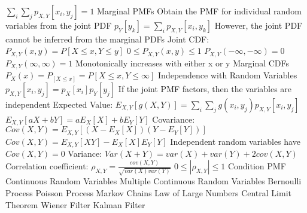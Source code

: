 \documentclass[14pt]{extarticle}
\begin{document}
\begin{outline}
			\2	$\sum_i \sum_j p_{X,Y}[x_i,y_j] = 1$
			\2	Marginal PMFs
				\3	Obtain the PMF for individual random variables from the joint PDF
				\3	$p_Y[y_k] = \sum_i p_{X,Y}[x_i,y_k]$
				\3	However, the joint PDF cannot be inferred from the marginal PDFs
			\2	Joint CDF:	$P_{X,Y}(x,y) = P[X \le x, Y \le y]$
				\3	$0 \le P_{X,Y}(x,y) \le 1$
				\3	$P_{X,Y}(-\infty,-\infty) = 0$
				\3	$P_{X,Y}(\infty,\infty) = 1$
				\3	Monotonically increases with either x or y
			\2	Marginal CDFs
				\3	$P_X(x) = P_[X \le x] = P[X \le x, Y \le \infty]$
			\2	Independence with Random Variables
				\3	$p_{X,Y}[x_i,y_j] = p_X[x_i]p_Y[y_j]$
				\3	If the joint PMF factors, then the variables are independent
			\2	Expected Value: $E_{X,Y}[g(X,Y)] = \sum_i \sum_j g(x_i,y_j) p_{X,Y}[x_i,y_j]$
				\3	$E_{X,Y}[aX + bY] = aE_X[X] + bE_Y[Y]$
			\2	Covariance:	$Cov(X,Y) = E_{X,Y}[(X - E_X[X])(Y - E_Y[Y])]$
				\3	$Cov(X,Y) = E_{X,Y}[XY] - E_X[X]E_Y[Y]$
				\3	Independent random variables have $Cov(X,Y) = 0$
			\2	Variance: $Var(X + Y) = var(X) + var(Y) + 2cov(X,Y)$
			\2	Correlation coefficient: $\rho_{X,Y} = \frac{cov(X,Y)}{\sqrt{var(X)var(Y)}}$
				\3	$0 \le |\rho_{X,Y}| \le 1$
			\2	Condition PMF
		\1	Continuous Random Variables
		\1	Multiple Continuous Random Variables
		\1	Bernoulli Process
		\1	Poisson Process
		\1	Markov Chains
		\1	Law of Large Numbers
		\1	Central Limit Theorem
		\1	Wiener Filter
		\1	Kalman Filter
	\end{outline}
\end{document}
